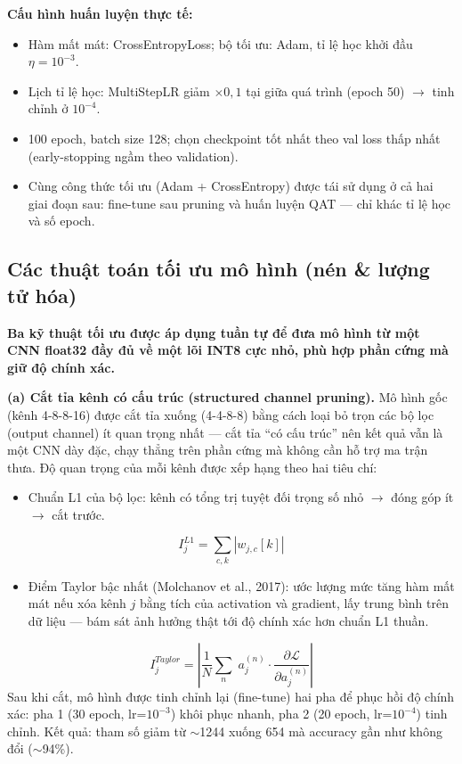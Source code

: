 \documentclass[12pt,a4paper]{article}
\begin{document}
\textbf{Cấu hình huấn luyện thực tế:}
\begin{itemize}
  \item Hàm mất mát: CrossEntropyLoss; bộ tối ưu: Adam, tỉ lệ học khởi đầu $\eta = 10^{-3}$.
  \item Lịch tỉ lệ học: MultiStepLR giảm $\times 0,1$ tại giữa quá trình (epoch 50)
        $\rightarrow$ tinh chỉnh ở $10^{-4}$.
  \item 100 epoch, batch size 128; chọn checkpoint tốt nhất theo val loss thấp nhất
        (early-stopping ngầm theo validation).
  \item Cùng công thức tối ưu (Adam + CrossEntropy) được tái sử dụng ở cả hai giai đoạn sau:
        fine-tune sau pruning và huấn luyện QAT --- chỉ khác tỉ lệ học và số epoch.
\end{itemize}

\subsection{Các thuật toán tối ưu mô hình (nén \& lượng tử hóa)}

\textbf{Ba kỹ thuật tối ưu được áp dụng tuần tự để đưa mô hình từ một CNN float32 đầy đủ về
một lõi INT8 cực nhỏ, phù hợp phần cứng mà giữ độ chính xác.}

\textbf{(a) Cắt tỉa kênh có cấu trúc (structured channel pruning).}
Mô hình gốc (kênh 4-8-8-16) được cắt tỉa xuống (4-4-8-8) bằng cách loại bỏ trọn các bộ lọc
(output channel) ít quan trọng nhất --- cắt tỉa ``có cấu trúc'' nên kết quả vẫn là một CNN
dày đặc, chạy thẳng trên phần cứng mà không cần hỗ trợ ma trận thưa. Độ quan trọng của mỗi
kênh được xếp hạng theo hai tiêu chí:
\begin{itemize}
  \item Chuẩn L1 của bộ lọc: kênh có tổng trị tuyệt đối trọng số nhỏ $\rightarrow$ đóng góp
        ít $\rightarrow$ cắt trước.
\end{itemize}
\begin{equation}
  I_j^{L1} = \sum_{c,k} \left| w_{j,c}[k] \right|
\end{equation}
\begin{itemize}
  \item Điểm Taylor bậc nhất (Molchanov et al., 2017): ước lượng mức tăng hàm mất mát nếu xóa
        kênh $j$ bằng tích của activation và gradient, lấy trung bình trên dữ liệu --- bám sát
        ảnh hưởng thật tới độ chính xác hơn chuẩn L1 thuần.
\end{itemize}
\begin{equation}
  I_j^{Taylor} = \left| \frac{1}{N}\sum_{n}\; a_j^{(n)} \cdot \frac{\partial \mathcal{L}}{\partial a_j^{(n)}} \right|
\end{equation}
Sau khi cắt, mô hình được tinh chỉnh lại (fine-tune) hai pha để phục hồi độ chính xác: pha 1
(30 epoch, lr=$10^{-3}$) khôi phục nhanh, pha 2 (20 epoch, lr=$10^{-4}$) tinh chỉnh. Kết quả:
tham số giảm từ $\sim$1244 xuống 654 mà accuracy gần như không đổi ($\sim$94\%).
\end{document}

